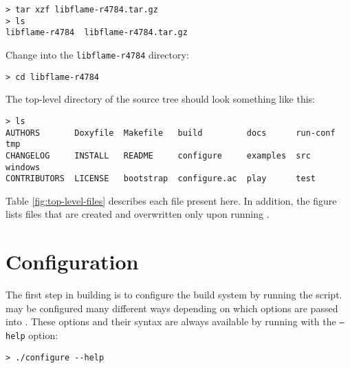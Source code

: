\begin{Verbatim}[frame=single,framesep=2.5mm,xleftmargin=5mm,commandchars=\\\{\},fontsize=\footnotesize]
> tar xzf libflame-r4784.tar.gz
> ls
libflame-r4784  libflame-r4784.tar.gz
\end{Verbatim}

\noindent
Change into the {\tt libflame-r4784} directory:

\begin{Verbatim}[frame=single,framesep=2.5mm,xleftmargin=5mm,commandchars=\\\{\},fontsize=\footnotesize]
> cd libflame-r4784
\end{Verbatim}

\noindent
The top-level directory of the source tree should look something like this:

\begin{Verbatim}[frame=single,framesep=2.5mm,xleftmargin=5mm,commandchars=\\\{\},fontsize=\footnotesize]
> ls
AUTHORS       Doxyfile  Makefile   build         docs      run-conf  tmp
CHANGELOG     INSTALL   README     configure     examples  src       windows
CONTRIBUTORS  LICENSE   bootstrap  configure.ac  play      test
\end{Verbatim}

\noindent
Table \ref{fig:top-level-files} describes each file present here.
In addition, the figure lists files that are created and overwritten
only upon running \configurens.




\section{Configuration}


The first step in building \libflame is to configure the build system by
running the \configure script.
\libflame may be configured many different ways depending on which options
are passed into \configurens.
These options and their syntax are always available by running \configure
with the {\tt --help} option:

\begin{Verbatim}[frame=single,framesep=2.5mm,xleftmargin=5mm,commandchars=\\\{\},fontsize=\footnotesize]
> ./configure --help
\end{Verbatim}

